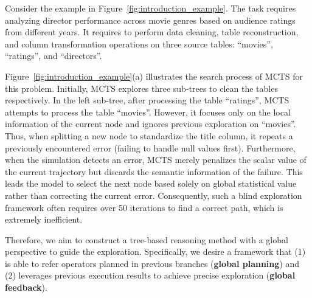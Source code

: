 \begin{example}
    Consider the example in Figure~\ref{fig:introduction_example}. The task requires analyzing director performance across movie genres based on audience ratings from different years. It requires to perform data cleaning, table reconstruction, and column transformation operations on three source tables: ``{movies}'', ``{ratings}'', and ``{directors}''.

    Figure~\ref{fig:introduction_example}(a) illustrates the search process of MCTS for this problem. Initially, MCTS explores three sub-trees to clean the tables respectively. In the left sub-tree, after processing the table ``{ratings}'', MCTS attempts to process the table ``{movies}''. However, it focuses only on the local information of the current node and ignores previous exploration on ``{movies}''. Thus, when splitting a new node to standardize the {title} column, it repeats a previously encountered error (\eg failing to handle null values first). Furthermore, when the simulation detects an error, MCTS merely penalizes the scalar value of the current trajectory but discards the semantic information of the failure. This leads the model to select the next node based solely on global statistical value rather than correcting the current error.
    Consequently, such a blind exploration framework often requires over 50 iterations to find a correct path, which is extremely inefficient.
\end{example}

Therefore, we aim to construct a tree-based reasoning method with a global perspective to guide the exploration.
Specifically, we desire a framework that (1) is able to refer operators planned in previous branches (\textbf{global planning}) and (2) leverages previous execution results to achieve precise exploration (\textbf{global feedback}).



